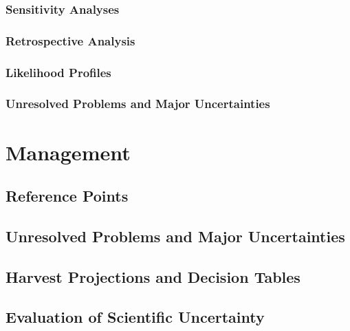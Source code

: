 \documentclass[11pt,
  english,
  letterpaper,
]{article}
\begin{document}
\hypertarget{sensitivity-analyses}{%
\subsubsection{Sensitivity Analyses}\label{sensitivity-analyses}}

\hypertarget{retrospective-analysis}{%
\subsubsection{Retrospective Analysis}\label{retrospective-analysis}}

\hypertarget{likelihood-profiles}{%
\subsubsection{Likelihood Profiles}\label{likelihood-profiles}}

\hypertarget{unresolved-problems-and-major-uncertainties-1}{%
\subsubsection{Unresolved Problems and Major Uncertainties}\label{unresolved-problems-and-major-uncertainties-1}}

\hypertarget{management}{%
\section{Management}\label{management}}

\hypertarget{reference-points-2}{%
\subsection{Reference Points}\label{reference-points-2}}

\hypertarget{unresolved-problems-and-major-uncertainties-2}{%
\subsection{Unresolved Problems and Major Uncertainties}\label{unresolved-problems-and-major-uncertainties-2}}

\hypertarget{harvest-projections-and-decision-tables}{%
\subsection{Harvest Projections and Decision Tables}\label{harvest-projections-and-decision-tables}}

\hypertarget{evaluation-of-scientific-uncertainty}{%
\subsection{Evaluation of Scientific Uncertainty}\label{evaluation-of-scientific-uncertainty}}
\end{document}
